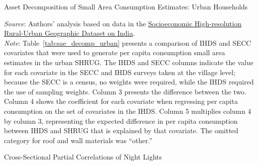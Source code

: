 \documentclass[12pt,letterpaper]{article}
\begin{document}
\begin{appendix}
\begin{center}
\begin{table}[H]
    \label{tab:sae_decomp_rural}
  \end{table}
\end{center}

\begin{center}
  \begin{table}[H]
    \caption{Asset Decomposition of Small Area Consumption Estimates: \cnewline Urban Households} 
      \begin{center}
        \scriptsize{}
      \end{center}

    \scriptsize \textit{Source}: Authors' analysis based on data in the \href{http://www.devdatalab.org/shrug}{Socioeconomic High-resolution
      Rural-Urban Geographic Dataset on India}. \\
    \scriptsize \textit{Note}: Table~\ref{tab:sae_decomp_urban} presents a
    comparison of IHDS and SECC covariates that were used to generate
    per capita consumption small area estimates in the urban
    SHRUG. The IHDS and SECC columns indicate the value for each
    covariate in the SECC and IHDS surveys taken at the village level;
    because the SECC is a census, no weights were required, while the
    IHDS required the use of sampling weights. Column 3 presents the
    difference between the two. Column 4 shows the coefficient for
    each covariate when regressing per capita consumption on the set
    of covariates in the IHDS. Column 5 multiplies column 4 by column
    3, representing the expected difference in per capita consumption
    between IHDS and SHRUG that is explained by that covariate. The
    omitted category for roof and wall materials was ``other.''
    \label{tab:sae_decomp_urban}
  \end{table}
\end{center}


\begin{table}[H]
  \caption{Cross-Sectional Partial Correlations of Night Lights} 


\end{table}
\end{appendix}
\end{document}
